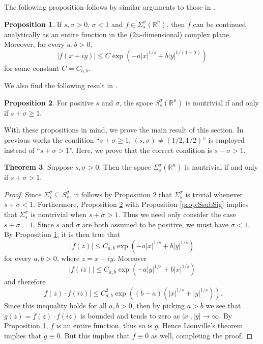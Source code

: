 \documentclass[11pt,a4paper,reqno]{amsart}
\numberwithin{equation}{section}
\theoremstyle{definition}
\newtheorem{thm}{Theorem}[section]
\newtheorem{prop}[thm]{Proposition}
\theoremstyle{definition}
\begin{document}
The following proposition follows by similar arguments to those in \cite[p.~172-175]{gel}.
\begin{prop}\label{prop:SigCest}
If $s,\sigma >0$, $\sigma < 1$ and $f\in \Sigma_s^\sigma(\mathbb{R}^n)$, then $f$ can be continued analytically as an entire function in the ($2n$-dimensional) complex plane. Moreover, for every $a,b>0$,
\begin{equation*}
    |f(x+i y)| \leq C \exp{\left(-a|x|^{1/s} + b |y|^{1/(1-\sigma)}\right)}
\end{equation*}
for some constant $C=C_{a,b}$.
\end{prop}
We also find the following result in \cite[p.~228-233]{gel}.
\begin{prop}\label{prop:Striv}
For positive $s$ and $\sigma$, the space $S_s^\sigma(\mathbb{R}^n)$ is nontrivial if and only if $s+\sigma \geq 1$.
\end{prop}
With these propositions in mind, we prove the main result of this section. In previous works the condition ``$s+\sigma \geq 1$, $(s,\sigma) \neq (1/2,1/2)$'' is employed instead of ``$s+\sigma > 1$''. Here, we prove that the correct condition is $s+\sigma > 1$.
\begin{thm} \label{thm:Sigtriv}
Suppose $s,\sigma >0$. Then the space $\Sigma_s^\sigma(\mathbb{R}^n)$ is nontrivial if and only if $s+\sigma > 1$.
\end{thm}
\begin{proof}
Since $\Sigma_s^\sigma \subseteq S_s^\sigma$, it follows by Proposition \ref{prop:Striv} that $\Sigma_s^\sigma$ is trivial whenever $s+\sigma < 1$. Furthermore, Proposition \ref{prop:Striv} with Proposition \ref{prop:SsubSig} implies that $\Sigma_s^\sigma$ is nontrivial when $s+\sigma > 1$. Thus we need only consider the case $s+\sigma = 1$. Since $s$ and $\sigma$ are both assumed to be positive, we must have $\sigma < 1$. By Proposition \ref{prop:SigCest}, it is then true that
\begin{equation*}
    |f(z)| \leq C_{a,b} \exp{\left(-a|x|^{1/s} + b |y|^{1/s}\right)}
\end{equation*}
for every $a,b>0$, where $z=x+i y$. Moreover
\begin{equation*}
    |f(i z)| \leq C_{a,b} \exp{\left(-a|y|^{1/s} + b |x|^{1/s}\right)}
\end{equation*}
and therefore
\begin{equation*}
    | f(z)\cdot f(i z) | \leq C_{a,b}^2 \exp{\left( (b-a)( |x|^{1/s} + |y|^{1/s}) \right)}.
\end{equation*}
Since this inequality holds for all $a,b>0$, then by picking $a>b$ we see that $g(z) = f(z)\cdot f(i z)$ is bounded and tends to zero as $|x|,|y|\rightarrow \infty$. By Proposition \ref{prop:SigCest}, $f$ is an entire function, thus so is $g$. Hence Liouville's theorem implies that $g \equiv 0$. But this implies that $f\equiv 0$ as well, completing the proof.
\end{proof}
\end{document}
